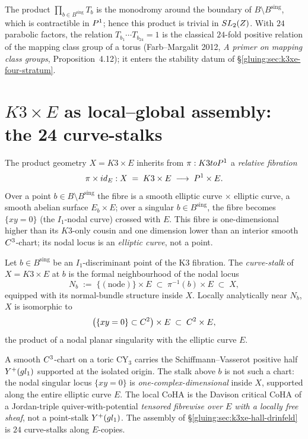 \begin{remark}
\label{gluing:rem:global-monodromy-trivial}
The product $\prod_{b \in B^{\mathrm{sing}}} T_b$ is the monodromy
around the boundary of $B \setminus B^{\mathrm{sing}}$, which is
contractible in $P^1$; hence this product is trivial in
$SL_2(Z)$. With $24$ parabolic factors, the relation
$T_{b_1} \cdots T_{b_{24}} = 1$ is the classical $24$-fold positive
relation of the mapping class group of a torus (Farb--Margalit 2012,
\emph{A primer on mapping class groups}, Proposition~4.12); it enters
the stability datum of \S\ref{gluing:sec:k3xe-four-stratum}.
\end{remark}

\section{$K3 \times E$ as local--global assembly: the 24 curve-stalks}
\label{gluing:sec:k3xe-local-global-assembly}

The product geometry $X = K3 \times E$ inherits from $\pi : K3 to
P^1$ a \emph{relative fibration}
\[
 \pi \times id_E : X \;=\; K3 \times E
 \;\longrightarrow\; P^1 \times E.
\]
Over a point $b \in B \setminus B^{\mathrm{sing}}$ the fibre is a
smooth elliptic curve $\times$ elliptic curve, a smooth abelian surface
$E_b \times E$; over a singular $b \in B^{\mathrm{sing}}$, the fibre
becomes $\{xy = 0\}$ (the $I_1$-nodal curve) crossed with $E$. This
fibre is one-dimensional higher than its $K3$-only cousin and one
dimension lower than an interior smooth $C^3$-chart; its nodal
locus is an \emph{elliptic curve}, not a point.

\begin{definition}
\label{gluing:def:curve-stalk}
Let $b \in B^{\mathrm{sing}}$ be an $I_1$-discriminant point of the
K3 fibration. The \emph{curve-stalk} of $X = K3 \times E$ at $b$ is the
formal neighbourhood of the nodal locus
\[
 N_b \;:=\; \{(\mathrm{node})\} \times E \;\subset\; \pi^{-1}(b)
 \times E \;\subset\; X,
\]
equipped with its normal-bundle structure inside $X$. Locally
analytically near $N_b$, $X$ is isomorphic to
\[
 \bigl(\{xy = 0\} \subset C^2\bigr) \times E \;\subset\; C^2 \times E,
\]
the product of a nodal planar singularity with the elliptic curve $E$.
\end{definition}

\begin{remark}
\label{gluing:rem:not-smooth-C3}
A smooth $C^3$-chart on a toric CY$_3$ carries the
Schiffmann--Vasserot positive half $Y^{+}(gl_1)$
supported at the isolated origin. The stalk above $b$ is not such a
chart: the nodal singular locus $\{xy = 0\}$ is
\emph{one-complex-dimensional} inside $X$, supported along the entire
elliptic curve $E$. The local CoHA is the Davison critical CoHA of a
Jordan-triple quiver-with-potential \emph{tensored fibrewise over
$E$ with a locally free sheaf}, not a point-stalk
$Y^{+}(gl_1)$. The assembly of
\S\ref{gluing:sec:k3xe-hall-drinfeld} is $24$ curve-stalks along
$E$-copies.
\end{remark}

